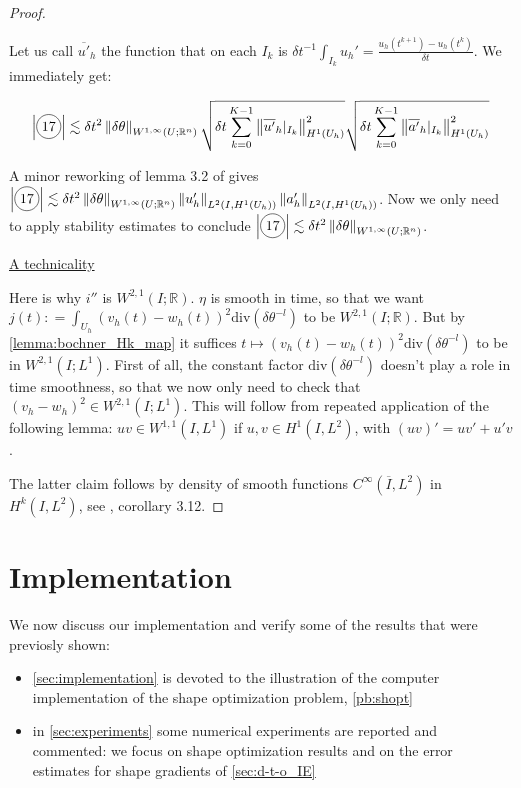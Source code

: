 \documentclass[english,a4paper,9pt,oneside]{scrbook}	%
\theoremstyle{break}
\newenvironment{mproof}[1][\proofname]{%
  \begin{proof}[#1]$ $\par\nobreak\ignorespaces
}{%
  \end{proof}
}
\renewcommand*{\proofname}{Proof}
\theoremstyle{remark}
\newcommand{\mR}{\mathbb{R}}
\newcommand{\ds}{\displaystyle}
\newcommand{\norm}[1]{\left\lVert#1\right\rVert}
\newcommand{\te}{\theta}
\newcommand{\dive}{\text{div}}
\newcommand*\circled[1]{\tikz[baseline=(char.base)]{
            \node[shape=circle,draw,inner sep=2pt] (char) {#1};}}
\begin{document}
\begin{mproof}
Let us call $\overline{u'}_h$ the function that on each $I_k$ is $\delta t^{-1}\ds \int_{I_k} u_h' = \frac{u_h(t^{k+1})-u_h(t^{k})}{\delta t}$. We immediately get:

\begin{align*}
\left | \circled{17} \right | \lesssim \delta t^2 \ds \norm{\delta \te}_{W^{1,\infty}(U;\mR^n)}\sqrt{\delta t \sum_{k=0}^{K-1} \norm{{\overline{u'}_h}|_{I_k}}_{H^1(U_h)}^2}\sqrt{\delta t \sum_{k=0}^{K-1} \norm{{\overline{a'}_h}|_{I_k}}_{H^1(U_h)}^2}
\end{align*}

A minor reworking of lemma 3.2 of \cite{lshou} gives $\left | \circled{17} \right | \lesssim \delta t^2\norm{\delta \te}_{W^{1,\infty}(U;\mR^n)} \norm{u_h'}_{L^2(I,H^1(U_h))}\norm{a_h'}_{L^2(I,H^1(U_h))}$. Now we only need to apply stability estimates to conclude  $\left | \circled{17} \right | \lesssim \delta t^2 \norm{\delta \te}_{W^{1,\infty}(U;\mR^n)}$.

\underline{A technicality}

Here is why $i''$ is $W^{2,1}(I;\mR)$. $\eta$ is smooth in time, so that we want $j(t): = \int_{U_h}(v_h(t)-w_h(t))^2\dive(\delta \te^{-l})$ to be $W^{2,1}(I;\mR)$. But by \cref{lemma:bochner_Hk_map} it suffices $t \mapsto (v_h(t)-w_h(t))^2\dive(\delta \te^{-l})$ to be in $W^{2,1}(I;L^1)$. First of all, the constant factor $\dive(\delta \te^{-l})$ doesn't play a role in time smoothness, so that we now only need to check that $(v_h-w_h)^2\in W^{2,1}(I;L^1)$. This will follow from repeated application of the following lemma: $u v \in W^{1,1}(I,L^1)$ if $u,v \in H^1(I,L^2)$, with $(uv)' = uv'+u'v$.

The latter claim follows by density of smooth functions $C^{\infty}(\overline{I}, L^2)$ in $H^k(I,L^2)$, see \cite{kreuter}, corollary 3.12.

\end{mproof}

\chapter{Implementation}
\label{chap:num_exp}

We now discuss our implementation and verify some of the results that were previosly shown:

\begin{itemize}
	\item \cref{sec:implementation} is devoted to the illustration of the computer implementation of the shape optimization problem, \cref{pb:shopt}
	\item in \cref{sec:experiments} some numerical experiments are reported and commented: we focus on shape optimization results and on the error estimates for shape gradients of \cref{sec:d-t-o_IE}
\end{itemize}
\end{document}
